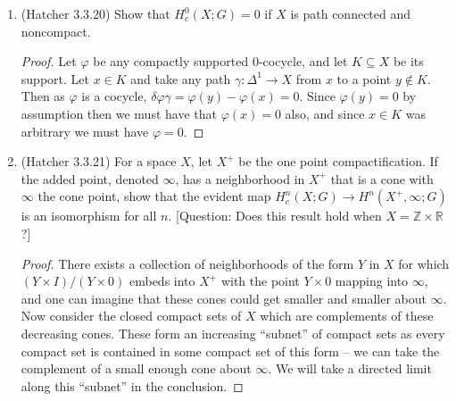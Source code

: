 \documentclass[11pt]{article}
\begin{document}
\begin{enumerate}
\begin{proof}
      The following is from Homework 4. The fundamental class $[N_g]$ generating $H_2(N_g)\cong \mathbb{Z}_2$ is given by $\sum_i T_i$ and the cocycles generating $H^1(N_g)\cong \mathbb{Z}_2^g$ are the functions $\alpha_i$ which take the value $0$ for edges not intersecting the corresponding arc $\alpha_i$ in the pictures and $1$ for edges that do intersect $\alpha_i$ -- that is, $\alpha_j(a_i) = \delta_{ij}$ and $\alpha_j(f_i) = \delta_{i(2j)}$.

      Then we have for $1\leq j \leq g$ that \[\alpha_j\cap [N_g] = \sum_{i=1}^{2g} \alpha_j\cap T_i = \sum_{i=1}^g (\alpha_j([a_i])[f_{2i-1}] + \alpha_j(a_i)[f_{2i}])= \sum_{i=1}^g \delta_{ij}[f_{2i-1} + f_{2i}] = [f_{2j-1} + f_{2j}],\] which means that $\alpha_j$ is Poincar\'e dual to $[f_{2j-1} + f_{2j}]$. But $\partial T_{2j-1} = f_{2j-1} + a_j + f_{2j}$ so that $[f_{2j-1} + f_{2j}] = [-a_j] = [a_j]$. It follows that $\alpha_j$ is Poincar\'e dual to $[a_j]$.
    \end{proof}
    \item (Hatcher 3.3.20) Show that $H^0_c(X;G)=0$ if $X$ is path connected and noncompact. \begin{proof}
      Let $\varphi$ be any compactly supported $0$-cocycle, and let $K\subseteq X$ be its support. Let $x\in K$ and take any path $\gamma\colon \Delta^1\to X$ from $x$ to a point $y\not\in K$. Then as $\varphi$ is a cocycle, $\delta \varphi \gamma = \varphi(y) -\varphi(x) = 0$. Since $\varphi(y) =0$ by assumption then we must have that $\varphi(x) = 0$ also, and since $x\in K$ was arbitrary we must have $\varphi =0$.
    \end{proof}
    \item (Hatcher 3.3.21) For a space $X$, let $X^+$ be the one point compactification. If the added point, denoted $\infty$, has a neighborhood in $X^+$ that is a cone with $\infty$ the cone point, show that the evident map $H^n_c(X;G)\to H^n(X^+,\infty;G)$ is an isomorphism for all $n$. [Question: Does this result hold when $X = \mathbb{Z}\times \mathbb{R}$?] \begin{proof}
      There exists a collection of  neighborhoods of the form $Y$ in $X$ for which $(Y\times I)/(Y\times 0)$ embeds into $X^+$ with the point $Y\times 0$ mapping into $\infty$, and one can imagine that these cones could get smaller and smaller about $\infty$. Now consider the closed compact sets of $X$ which are complements of these decreasing cones. These form an increasing ``subnet'' of compact sets as every compact set is contained in some compact set of this form -- we can take the complement of a small enough cone about $\infty$. We will take a directed limit along this ``subnet'' in the conclusion.


\end{proof}
\end{enumerate}
\end{document}
